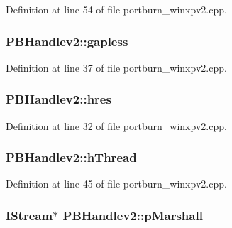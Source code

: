 Definition at line 54 of file portburn\+\_\+winxpv2.\+cpp.

\subsubsection[{\texorpdfstring{gapless}{gapless}}]{ P\+B\+Handlev2\+::gapless}\hypertarget{struct_p_b_handlev2_afcccfedecdaae5ef4936babcdc300689}{}\label{struct_p_b_handlev2_afcccfedecdaae5ef4936babcdc300689}


Definition at line 37 of file portburn\+\_\+winxpv2.\+cpp.

\subsubsection[{\texorpdfstring{hres}{hres}}]{ P\+B\+Handlev2\+::hres}\hypertarget{struct_p_b_handlev2_a1813bf4ddcda497a7f73d29f1c5daead}{}\label{struct_p_b_handlev2_a1813bf4ddcda497a7f73d29f1c5daead}


Definition at line 32 of file portburn\+\_\+winxpv2.\+cpp.

\subsubsection[{\texorpdfstring{h\+Thread}{hThread}}]{ P\+B\+Handlev2\+::h\+Thread}\hypertarget{struct_p_b_handlev2_a9432074fbafca830cb4be9f84090a659}{}\label{struct_p_b_handlev2_a9432074fbafca830cb4be9f84090a659}


Definition at line 45 of file portburn\+\_\+winxpv2.\+cpp.

\subsubsection[{\texorpdfstring{p\+Marshall}{pMarshall}}]{\setlength{\rightskip}{0pt plus 5cm}I\+Stream$\ast$ P\+B\+Handlev2\+::p\+Marshall}\hypertarget{struct_p_b_handlev2_ac1af996dd35d93cd571aa0c2a182e86e}{}\label{struct_p_b_handlev2_ac1af996dd35d93cd571aa0c2a182e86e}


